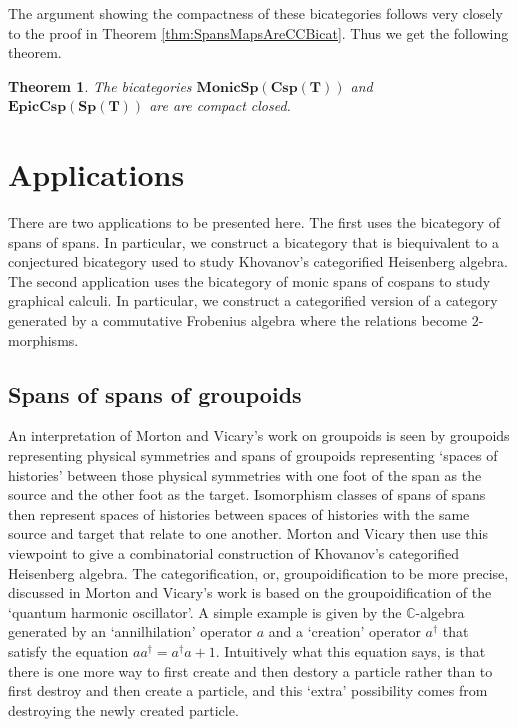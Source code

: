 \documentclass[11pt]{amsart}
\newcommand{\bimonspcsp}[1]{\mathbf{MonicSp(Csp(#1))}}
\newcommand{\biepiccspsp}[1]{\mathbf{EpicCsp(Sp(#1))}}
\newtheorem{thm}{Theorem}[section]
\theoremstyle{remark}
\theoremstyle{definition}
\begin{document}
The argument showing the compactness of these bicategories follows very closely to the proof in Theorem \ref{thm:SpansMapsAreCCBicat}. Thus we get the following theorem.

\begin{thm}
	\label{thm:SpansCospansAreCCBicat}
	The bicategories $\bimonspcsp{T}$ and $\biepiccspsp{T}$ are are compact closed.
\end{thm}

\section{Applications} %
\label{sec:Applications}

There are two applications to be presented here.  The first uses the bicategory of spans of spans.  In particular, we construct a bicategory that is biequivalent to a conjectured bicategory used to study Khovanov's categorified Heisenberg algebra.  The second application uses the bicategory of monic spans of cospans to study graphical calculi.  In particular, we construct a categorified version of a category generated by a commutative Frobenius algebra where the relations become $2$-morphisms.


\subsection{Spans of spans of groupoids} %
\label{subsec:SpanSpanGroupoid}


An interpretation of Morton and Vicary's \cite{MortVic} work on groupoids is seen by groupoids representing physical symmetries and spans of groupoids representing `spaces of histories' between those physical symmetries with one foot of the span as the source and the other foot as the target. Isomorphism classes of spans of spans then represent spaces of histories between spaces of histories with the same source and target that relate to one another. Morton and Vicary then use this viewpoint to give a combinatorial construction of Khovanov's categorified Heisenberg algebra. The categorification, or, groupoidification to be more precise, discussed in Morton and Vicary's work is based on the groupoidification of the `quantum harmonic oscillator'. A simple example is given by the $\mathbb{C}$-algebra generated by an `annilhilation' operator $a$ and a `creation' operator $a^\dagger$ that satisfy the equation $aa^\dagger=a^\dagger a+1$. Intuitively what this equation says, is that there is one more way to first create and then destory a particle rather than to first destroy and then create a particle, and this `extra' possibility comes from destroying the newly created particle.
\end{document}
